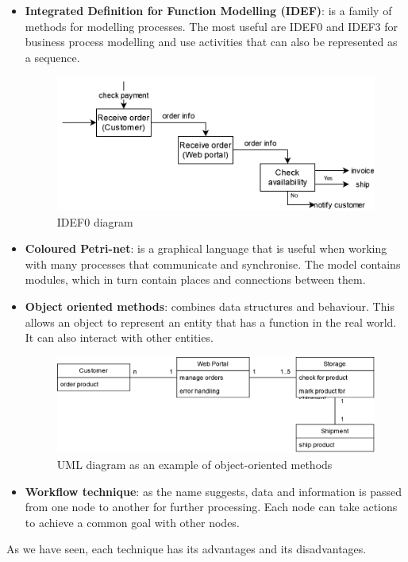 \begin{itemize}
    \item \textbf{Integrated Definition for Function Modelling (IDEF)}: is a family of methods for modelling processes. The most useful are IDEF0 and IDEF3 for business process modelling and use activities that can also be represented as a sequence.

    \begin{figure}[h]
    \centering
    \includegraphics[width=\textwidth/2]{images/BPMN/idef_sample.drawio.png}
    \caption{\label{fig:bpmn_IDEF_diagram}IDEF0 diagram}
    \end{figure}
    
    \item \textbf{Coloured Petri-net}: is a graphical language that is useful when working with many processes that communicate and synchronise. The model contains modules, which in turn contain places and connections between them.
    
    \item \textbf{Object oriented methods}: combines data structures and behaviour. This allows an object to represent an entity that has a function in the real world. It can also interact with other entities.

    \begin{figure}[h]
    \centering
    \includegraphics[width=\textwidth/2]{images/BPMN/uml_sample.drawio.png}
    \caption{\label{fig:bpmn_uml_diagram}UML diagram as an example of object-oriented methods}
    \end{figure}
    
    \item \textbf{Workflow technique}: as the name suggests, data and information is passed from one node to another for further processing. Each node can take actions to achieve a common goal with other nodes. 
    
\end{itemize}

As we have seen, each technique has its advantages and its disadvantages.
